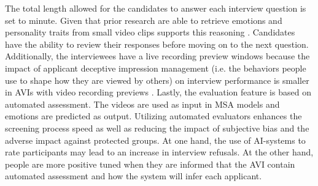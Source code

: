 The total length allowed for the candidates to answer each interview question is set to minute. Given that prior research are able to retrieve emotions and personality traits from small video clips supports this reasoning \cite{model_based_fusion6122012} \cite{video-interview4-SUMAN2022107715}. Candidates have the ability to review their responses before moving on to the next question. Additionally, the interviewees have a live recording preview windows because the impact of applicant deceptive impression management (i.e. the behaviors people use to shape how they are viewed by others) on interview performance is smaller in AVIs with video recording previews \cite{video-interview1-LUKACIK2022100789}. Lastly, the evaluation feature is based on automated assessment. The videos are used as input in MSA models and emotions are predicted as output. Utilizing automated evaluators enhances the screening process speed as well as reducing the impact of subjective bias and the adverse impact against protected groups. At one hand, the use of AI-systems to rate participants may lead to an increase in interview refusals. At the other hand, people are more positive tuned when they are informed that the AVI contain automated assessment and how the system will infer each applicant. 
%
